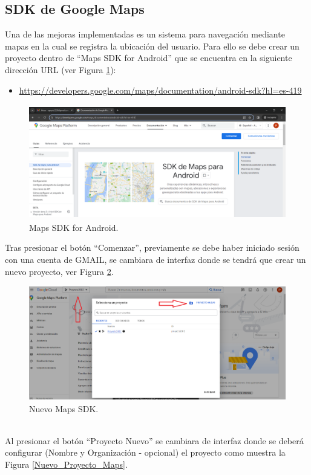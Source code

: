 \documentclass[a4paper,10pt, oneside, titlepage]{article}
\begin{document}
	\subsection{SDK de Google Maps}
	Una de las mejoras implementadas es un sistema para navegación mediante mapas en la cual se registra la ubicación del usuario. Para ello se debe crear un proyecto dentro de ``Maps SDK for Android'' que se encuentra en la siguiente dirección URL (ver Figura \ref{Maps_SDK_Android}):
	\begin{itemize}
		\item \textcolor{blue}{\url{https://developers.google.com/maps/documentation/android-sdk?hl=es-419}}
	\end{itemize}
	\begin{figure}[!h]
		\centering
		\includegraphics[width = 1\linewidth, height = 5cm]{Maps_SDK_Android.png}
		\caption{Maps SDK for Android.}
		\label{Maps_SDK_Android}
	\end{figure}
	\indent \indent Tras presionar el botón ``Comenzar'', previamente se debe haber iniciado sesión con una cuenta de GMAIL, se cambiara de interfaz donde se tendrá que crear un nuevo proyecto, ver Figura \ref{Nuevo_Maps_SDK}.
	\begin{figure}[!h]
		\centering
		\includegraphics[width = 1\linewidth, height = 5cm]{Nuevo_Maps_SDK.png}
		\caption{Nuevo Maps SDK.}
		\label{Nuevo_Maps_SDK}
	\end{figure} \\
	\indent Al presionar el botón ``Proyecto Nuevo'' se cambiara de interfaz donde se deberá configurar (Nombre y Organización - opcional) el proyecto como muestra la Figura \ref{Nuevo_Proyecto_Maps}.
\end{document}
